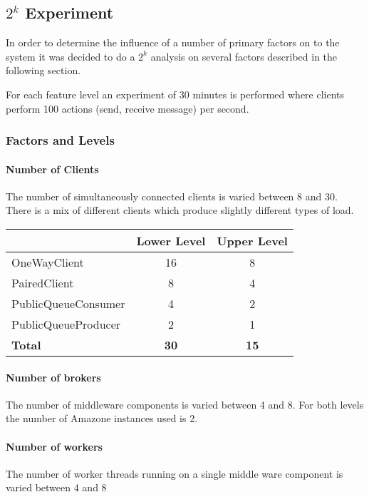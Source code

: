 \documentclass[milestone1.tex]{subfiles}
\begin{document}
\subsection{$2^k$ Experiment}
In order to determine the influence of a number of primary factors on to the system it was decided to do a $2^k$ analysis on several factors described in the following section.

For each feature level an experiment of 30 minutes is performed where clients perform 100 actions (send, receive message) per second.

\subsubsection{Factors and Levels}

\paragraph{Number of Clients}
The number of simultaneously connected clients is varied between 8 and 30. There is a mix of different clients which produce slightly different types of load.

\begin{tabular}{|l|c|c|}
\hline 
 & Lower Level & Upper Level \\ 
\hline 
OneWayClient & 16 & 8  \\ 
\hline 
PairedClient & 8 & 4 \\ 
\hline 
PublicQueueConsumer & 4 & 2 \\ 
\hline 
PublicQueueProducer & 2 & 1 \\ 
\hline 
\textbf{Total}  & \textbf{30} & \textbf{15} \\
\hline 
\end{tabular} 

\paragraph{Number of brokers}

The number of middleware components is varied between 4 and 8. For both levels the number of Amazone instances used is 2.

\paragraph{Number of workers}

The number of worker threads running on a single middle ware component is varied between 4 and 8
\end{document}
